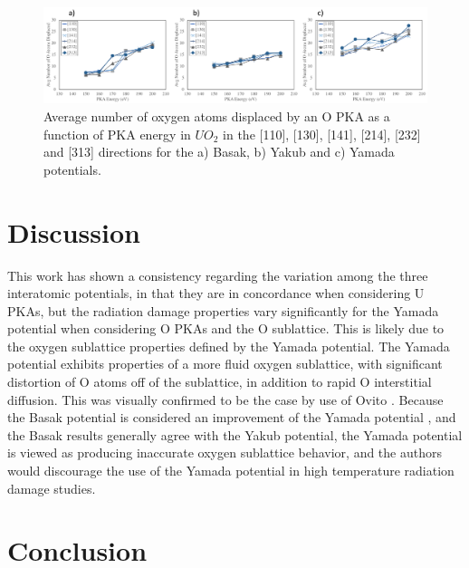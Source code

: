 \documentclass[8pt]{article}   	%
\begin{document}
\begin{figure}[h]
 \centering
 \includegraphics[width=1.0\textwidth]{dispO_OE.png}
 \caption{Average number of oxygen atoms displaced by an O PKA as a function of PKA energy in $UO_2$ in the [110], [130], [141], [214], [232] and [313] directions for the a) Basak, b) Yakub and c) Yamada potentials.  }
 \label{fig:dispoe}
\end{figure}


\section{Discussion}

This work has shown a consistency regarding the variation among the three interatomic potentials, in that they are in concordance when considering U PKAs, but the radiation damage properties vary significantly for the Yamada potential when considering O PKAs and the O sublattice. This is likely due to the oxygen sublattice properties defined by the Yamada potential. The Yamada potential exhibits properties of a more fluid oxygen sublattice, with significant distortion of O atoms off of the sublattice, in addition to rapid O interstitial diffusion. This was visually confirmed to be the case by use of Ovito \cite{ovito}. Because the Basak potential is considered an improvement of the Yamada potential \cite{basak}, and the Basak results generally agree with the Yakub potential, the Yamada potential is viewed as producing inaccurate oxygen sublattice behavior, and the authors would discourage the use of the Yamada potential in high temperature radiation damage studies.

\section{Conclusion}
\hspace{5mm}
\end{document}
